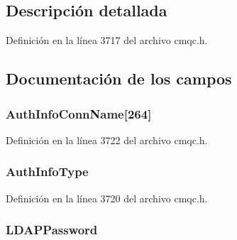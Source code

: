 \subsection{Descripción detallada}


Definición en la línea 3717 del archivo cmqc.\+h.



\subsection{Documentación de los campos}
\hypertarget{structtag_m_q_a_i_r_ae500a619d5c7accb19d376cc8e90b542}{}
\subsubsection[{Auth\+Info\+Conn\+Name}]{ Auth\+Info\+Conn\+Name\mbox{[}264\mbox{]}}\label{structtag_m_q_a_i_r_ae500a619d5c7accb19d376cc8e90b542}


Definición en la línea 3722 del archivo cmqc.\+h.

\hypertarget{structtag_m_q_a_i_r_ab6d5732a34c9e5537251a011b7c5cfd2}{}
\subsubsection[{Auth\+Info\+Type}]{ Auth\+Info\+Type}\label{structtag_m_q_a_i_r_ab6d5732a34c9e5537251a011b7c5cfd2}


Definición en la línea 3720 del archivo cmqc.\+h.

\hypertarget{structtag_m_q_a_i_r_aeec928bfebc24320430fca7f05918450}{}
\subsubsection[{L\+D\+A\+P\+Password}]{ L\+D\+A\+P\+Password}\label{structtag_m_q_a_i_r_aeec928bfebc24320430fca7f05918450}


